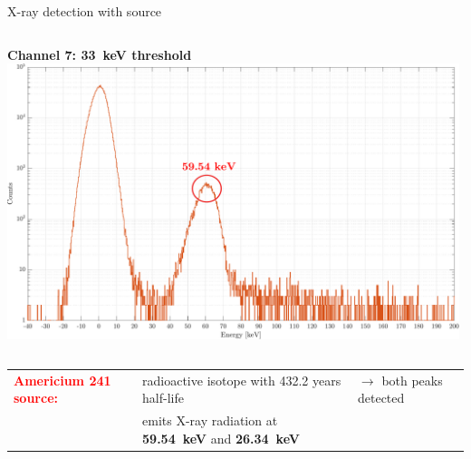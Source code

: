 \documentclass[aspectratio=169,xcolor=dvipsnamesz]{beamer} %
\newcommand\B{\rule[-1.2ex]{0pt}{0pt}} %
\newcommand{\greencheck}{{\color{ForestGreen}\checkmark}}
\begin{document}
\begin{frame}{X-ray detection with  source}
\begin{columns}
            \vskip0.18cm
            \textbf{Channel 7: \SI{33}{\kilo\electronvolt} threshold}
            \vskip0.1cm
            \includegraphics[width=0.99\textwidth]{images/muon_detection/americium/ch4_americio_log_ch7.pdf}  
    \end{columns}
    \fontsize{8.5pt}{1}\selectfont
    \vspace{0.2cm}
    \begin{tabular}{R{3cm} L{6.2cm} L{5cm}}
         \textbf{\textcolor{Red}{Americium 241 source:}} & radioactive isotope with 432.2 years half-life & $\rightarrow$ \hspace{0.2cm} both peaks detected \greencheck \B \\
         & emits X-ray radiation at \textbf{\SI{59.54}{\kilo\electronvolt}} and \textbf{\SI{26.34}{\kilo\electronvolt}}
    \end{tabular}
\end{frame}


\end{document}
